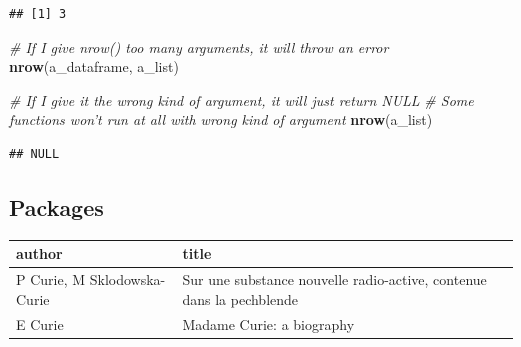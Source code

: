 \documentclass[
  openany]{book}
\newenvironment{Shaded}{\begin{snugshade}}{\end{snugshade}}
\newcommand{\CommentTok}[1]{\textcolor[rgb]{0.56,0.35,0.01}{\textit{#1}}}
\newcommand{\DataTypeTok}[1]{\textcolor[rgb]{0.13,0.29,0.53}{#1}}
\newcommand{\DecValTok}[1]{\textcolor[rgb]{0.00,0.00,0.81}{#1}}
\newcommand{\KeywordTok}[1]{\textcolor[rgb]{0.13,0.29,0.53}{\textbf{#1}}}
\newcommand{\NormalTok}[1]{#1}
\newcommand{\OperatorTok}[1]{\textcolor[rgb]{0.81,0.36,0.00}{\textbf{#1}}}
\newcommand{\OtherTok}[1]{\textcolor[rgb]{0.56,0.35,0.01}{#1}}
\newcommand{\StringTok}[1]{\textcolor[rgb]{0.31,0.60,0.02}{#1}}
\begin{document}
\begin{verbatim}
## [1] 3
\end{verbatim}

\begin{Shaded}
\begin{Highlighting}[]
\CommentTok{# If I give nrow() too many arguments, it will throw an error}
\KeywordTok{nrow}\NormalTok{(a_dataframe, a_list)}
\end{Highlighting}
\end{Shaded}

\begin{Shaded}
\begin{Highlighting}[]
\CommentTok{# If I give it the wrong kind of argument, it will just return NULL}
\CommentTok{# Some functions won't run at all with wrong kind of argument}
\KeywordTok{nrow}\NormalTok{(a_list)}
\end{Highlighting}
\end{Shaded}

\begin{verbatim}
## NULL
\end{verbatim}

\hypertarget{scholarex}{%
\subsection{Packages}\label{scholarex}}

\begin{Shaded}
\end{Shaded}

\begin{tabular}{l|l}
\hline
author & title\\
\hline
P Curie, M Sklodowska-Curie & Sur une substance nouvelle radio-active, contenue dans la pechblende\\
\hline
E Curie & Madame Curie: a biography\\
\hline
\end{tabular}
\end{document}
